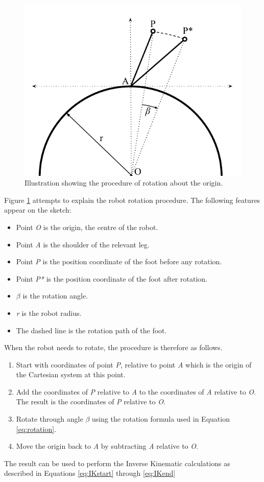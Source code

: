 \FloatBarrier
\begin{figure}[h]
\centering
\includegraphics[scale = 1]{pics/Body_Layout_6.pdf}
\caption{Illustration showing the procedure of rotation about the origin.}
\label{fig:Body_layout_6}
\end{figure}
\FloatBarrier

Figure \ref{fig:Body_layout_6} attempts to explain the robot rotation procedure. The following features appear on the sketch:
\begin{itemize}
\item Point \textit{O} is the origin, the centre of the robot.
\item Point \textit{A} is the shoulder of the relevant leg.
\item Point \textit{P} is the position coordinate of the foot before any rotation.
\item Point \textit{P*} is the position coordinate of the foot after rotation.
\item $\beta$ is the rotation angle.
\item \textit{r} is the robot radius.
\item The dashed line is the rotation path of the foot.
\end{itemize}

When the robot needs to rotate, the procedure is therefore as follows.
\begin{enumerate}
\item Start with coordinates of point \textit{P}, relative to point \textit{A} which is the origin of the Cartesian system at this point.
\item Add the coordinates of \textit{P} relative to \textit{A} to the coordinates of \textit{A} relative to \textit{O}. The result is the  coordinates of \textit{P} relative to \textit{O}.
\item Rotate through angle $\beta$ using the rotation formula used in Equation \ref{eq:rotation}.
\item Move the origin back to \textit{A} by subtracting \textit{A} relative to \textit{O}.
\end{enumerate}

The result can be used to perform the Inverse Kinematic calculations as described in Equations \ref{eq:IKstart} through \ref{eq:IKend}